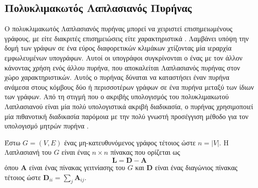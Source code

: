\subsection{Πολυκλιμακωτός Λαπλασιανός Πυρήνας}
\label{ssec:ml}
Ο πολυκλιμακωτός Λαπλασιανός πυρήνας μπορεί να χειριστεί επισημειωμένους γράφους, με είτε διακριτές επισημειώσεις είτε χαρακτηριστικά \cite{kondor2016multiscale}.
Λαμβάνει υπόψη την δομή των γράφων σε ένα εύρος διαφορετικών κλιμάκων χτίζοντας μία ιεραρχία εμφωλευμένων υπογράφων.
Αυτοί οι υπογράφοι συγκρίνονται ο ένας με τον άλλον κάνοντας χρήση ενός άλλου πυρήνα, που αποκαλείται Λαπλασιανός πυρήνας στον χώρο χαρακτηριστικών.
Αυτός ο πυρήνας δύναται να καταστήσει έναν πυρήνα ανάμεσα στους κόμβους δύο ή περισσοτέρων γράφων σε ένα πυρήνα μεταξύ των ίδιων των γράφων.
Από τη στιγμή που ο ακριβής υπολογισμός του πολυκλιμακωτού Λαπλασιανού είναι μία πολύ υπολογιστικά ακριβή διαδικασία, ο πυρήνας χρησιμοποιεί μία πιθανοτική διαδικασία παρόμοια με την πολύ γνωστή προσέγγιση μέθοδο  για τον υπολογισμό μητρών πυρήνα \cite{williams2001using}.

Έστω $G=(V,E)$ ένας μη-κατευθυνόμενος γράφος τέτοιος ώστε $n = |V|$.
Η Λαπλασιανή του $G$ είναι ένας $n \times n$ πίνακας που ορίζεται ως
\begin{equation*}
    \mathbf{L} = \mathbf{D} - \mathbf{A} 
\end{equation*}
όπου $\mathbf{A}$ είναι ένας πίνακας γειτνίασης του $G$ και $\mathbf{D}$ είναι ένας διαγώνιος πίνακας τέτοιος ώστε $\mathbf{D}_{ii} = \sum_j \mathbf{A}_{ij}$.

